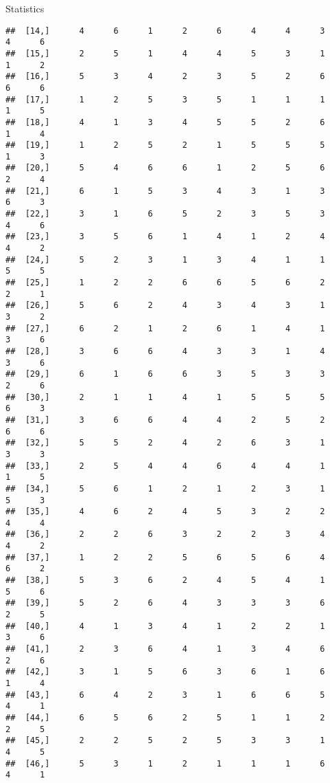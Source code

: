 \documentclass[
  ignorenonframetext,
]{beamer}
\begin{document}
\begin{frame}[fragile]{Statistics}
\begin{verbatim}
##  [14,]      4      6      1      2      6      4      4      3      4      6
##  [15,]      2      5      1      4      4      5      3      1      1      2
##  [16,]      5      3      4      2      3      5      2      6      6      6
##  [17,]      1      2      5      3      5      1      1      1      1      5
##  [18,]      4      1      3      4      5      5      2      6      1      4
##  [19,]      1      2      5      2      1      5      5      5      1      3
##  [20,]      5      4      6      6      1      2      5      6      2      4
##  [21,]      6      1      5      3      4      3      1      3      6      3
##  [22,]      3      1      6      5      2      3      5      3      4      6
##  [23,]      3      5      6      1      4      1      2      4      4      2
##  [24,]      5      2      3      1      3      4      1      1      5      5
##  [25,]      1      2      2      6      6      5      6      2      2      1
##  [26,]      5      6      2      4      3      4      3      1      3      2
##  [27,]      6      2      1      2      6      1      4      1      3      6
##  [28,]      3      6      6      4      3      3      1      4      3      6
##  [29,]      6      1      6      6      3      5      3      3      2      6
##  [30,]      2      1      1      4      1      5      5      5      6      3
##  [31,]      3      6      6      4      4      2      5      2      6      6
##  [32,]      5      5      2      4      2      6      3      1      3      3
##  [33,]      2      5      4      4      6      4      4      1      1      5
##  [34,]      5      6      1      2      1      2      3      1      5      3
##  [35,]      4      6      2      4      5      3      2      2      4      4
##  [36,]      2      2      6      3      2      2      3      4      4      2
##  [37,]      1      2      2      5      6      5      6      4      6      2
##  [38,]      5      3      6      2      4      5      4      1      5      6
##  [39,]      5      2      6      4      3      3      3      6      2      5
##  [40,]      4      1      3      4      1      2      2      1      3      6
##  [41,]      2      3      6      4      1      3      4      6      2      6
##  [42,]      3      1      5      6      3      6      1      6      1      4
##  [43,]      6      4      2      3      1      6      6      5      4      1
##  [44,]      6      5      6      2      5      1      1      2      2      5
##  [45,]      2      2      5      2      5      3      3      1      4      5
##  [46,]      5      3      1      2      1      1      1      6      4      1

\end{verbatim}
\end{frame}
\end{document}
